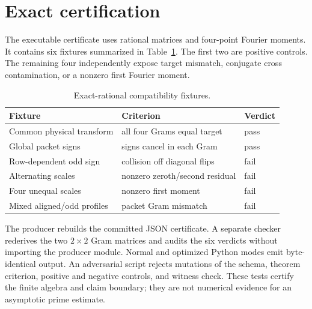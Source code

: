 \section{Exact certification}

The executable certificate uses rational matrices and four-point Fourier moments.  It
contains six fixtures summarized in Table~\ref{tab:fixtures}.  The first two are
positive controls.  The remaining four independently expose target mismatch, conjugate
cross contamination, or a nonzero first Fourier moment.

\begin{table}[ht]
\centering
\begin{tabular}{lll}
\toprule
Fixture & Criterion & Verdict\\
\midrule
Common physical transform & all four Grams equal target & pass\\
Global packet signs & signs cancel in each Gram & pass\\
Row-dependent odd sign & collision off diagonal flips & fail\\
Alternating scales & nonzero zeroth/second residual & fail\\
Four unequal scales & nonzero first moment & fail\\
Mixed aligned/odd profiles & packet Gram mismatch & fail\\
\bottomrule
\end{tabular}
\caption{Exact-rational compatibility fixtures.}
\label{tab:fixtures}
\end{table}

The producer rebuilds the committed JSON certificate.  A separate checker rederives
the two $2\times2$ Gram matrices and audits the six verdicts without importing the
producer module.  Normal and optimized Python modes emit byte-identical output.  An
adversarial script rejects mutations of the schema, theorem criterion, positive and
negative controls, and witness check.  These tests certify the finite algebra and claim
boundary; they are not numerical evidence for an asymptotic prime estimate.
